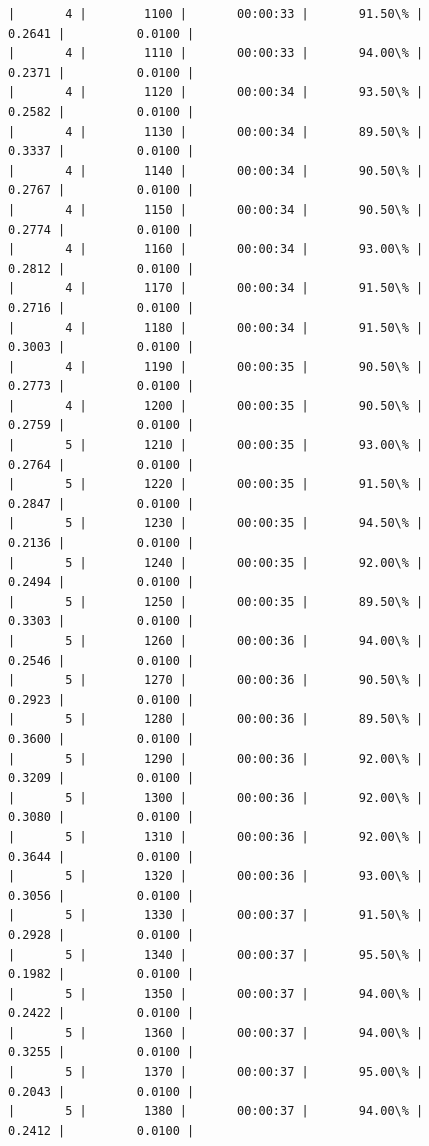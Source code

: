 \documentclass[11pt]{article}
\begin{document}
\begin{Verbatim}[commandchars=\\\{\}]
|       4 |        1100 |       00:00:33 |       91.50\% |       0.2641 |          0.0100 |
|       4 |        1110 |       00:00:33 |       94.00\% |       0.2371 |          0.0100 |
|       4 |        1120 |       00:00:34 |       93.50\% |       0.2582 |          0.0100 |
|       4 |        1130 |       00:00:34 |       89.50\% |       0.3337 |          0.0100 |
|       4 |        1140 |       00:00:34 |       90.50\% |       0.2767 |          0.0100 |
|       4 |        1150 |       00:00:34 |       90.50\% |       0.2774 |          0.0100 |
|       4 |        1160 |       00:00:34 |       93.00\% |       0.2812 |          0.0100 |
|       4 |        1170 |       00:00:34 |       91.50\% |       0.2716 |          0.0100 |
|       4 |        1180 |       00:00:34 |       91.50\% |       0.3003 |          0.0100 |
|       4 |        1190 |       00:00:35 |       90.50\% |       0.2773 |          0.0100 |
|       4 |        1200 |       00:00:35 |       90.50\% |       0.2759 |          0.0100 |
|       5 |        1210 |       00:00:35 |       93.00\% |       0.2764 |          0.0100 |
|       5 |        1220 |       00:00:35 |       91.50\% |       0.2847 |          0.0100 |
|       5 |        1230 |       00:00:35 |       94.50\% |       0.2136 |          0.0100 |
|       5 |        1240 |       00:00:35 |       92.00\% |       0.2494 |          0.0100 |
|       5 |        1250 |       00:00:35 |       89.50\% |       0.3303 |          0.0100 |
|       5 |        1260 |       00:00:36 |       94.00\% |       0.2546 |          0.0100 |
|       5 |        1270 |       00:00:36 |       90.50\% |       0.2923 |          0.0100 |
|       5 |        1280 |       00:00:36 |       89.50\% |       0.3600 |          0.0100 |
|       5 |        1290 |       00:00:36 |       92.00\% |       0.3209 |          0.0100 |
|       5 |        1300 |       00:00:36 |       92.00\% |       0.3080 |          0.0100 |
|       5 |        1310 |       00:00:36 |       92.00\% |       0.3644 |          0.0100 |
|       5 |        1320 |       00:00:36 |       93.00\% |       0.3056 |          0.0100 |
|       5 |        1330 |       00:00:37 |       91.50\% |       0.2928 |          0.0100 |
|       5 |        1340 |       00:00:37 |       95.50\% |       0.1982 |          0.0100 |
|       5 |        1350 |       00:00:37 |       94.00\% |       0.2422 |          0.0100 |
|       5 |        1360 |       00:00:37 |       94.00\% |       0.3255 |          0.0100 |
|       5 |        1370 |       00:00:37 |       95.00\% |       0.2043 |          0.0100 |
|       5 |        1380 |       00:00:37 |       94.00\% |       0.2412 |          0.0100 |

\end{Verbatim}
\end{document}
